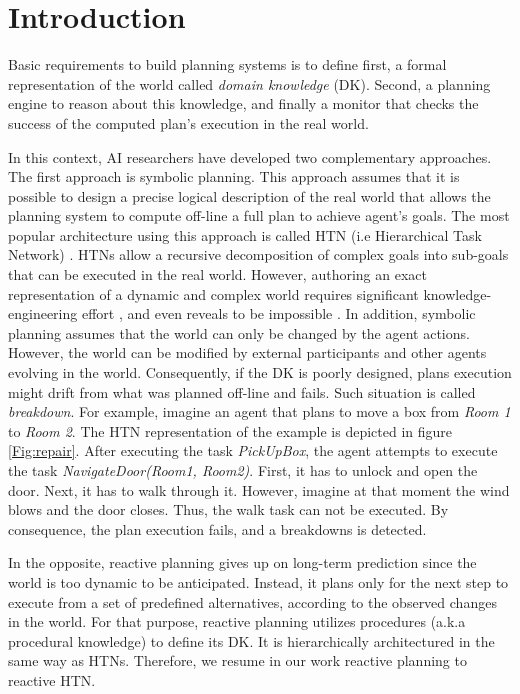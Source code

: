 \documentclass{llncs}
\begin{document}
			\section{Introduction}
		Basic requirements to build planning systems is to define first, a formal representation of the world called \emph{domain knowledge} (DK). Second, a planning engine to reason about this knowledge, and finally a monitor that checks the success of the computed plan's execution in the real world. 
		\par In this context, AI researchers have developed two complementary approaches. The first approach is symbolic planning. This approach assumes that it is possible to design a precise logical description of the real world that allows the planning system to compute  off-line a full plan to achieve agent's goals. The most popular architecture using this approach is called HTN (i.e Hierarchical Task Network) \cite{erol1996hierarchical}. HTNs allow a recursive decomposition of complex goals into sub-goals that can be executed in the real world. However, authoring an exact representation of a dynamic and complex world requires significant knowledge-engineering effort \cite{zhuo2009learning}, and even reveals to be impossible \cite{maes1990designing}. In addition, symbolic planning assumes that the world can only be changed by the agent actions. However, the world can be modified  by external participants and other agents evolving in the world. Consequently, if the DK is poorly designed, plans execution  might drift from what was planned off-line and fails. Such situation is called \emph{breakdown}. For example, imagine an agent that plans to move a box from \textit{Room 1} to \textit{Room 2}. The HTN representation of the example is depicted in figure \ref{Fig:repair}. After executing the task \textit{PickUpBox}, the agent attempts to execute the task \textit{NavigateDoor(Room1, Room2)}. First, it has to unlock and open the door. Next, it has to walk through it. However, imagine at that moment the wind blows and the door closes. Thus, the walk task can not be executed. By consequence, the plan execution fails, and a breakdowns is detected.  
		\par In the opposite, reactive planning \cite{firby1987investigation} gives up on long-term prediction since the world is too dynamic to be anticipated. Instead, it plans only for the next step to execute from a set of predefined alternatives, according to the observed changes in the world. For that purpose, reactive planning utilizes procedures (a.k.a procedural knowledge) to define its DK. It is hierarchically architectured in the same way as HTNs. Therefore, we resume in our work reactive planning to reactive HTN.
\end{document}

